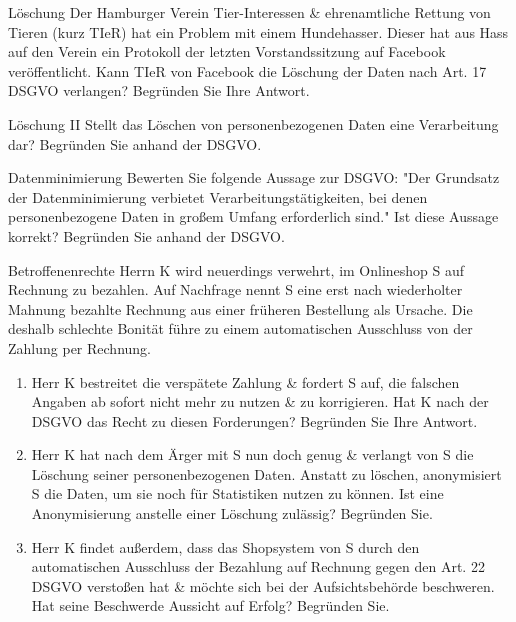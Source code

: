 \documentclass{exercisesheet}
\begin{document}
\begin{exercise*}{Löschung}
  Der Hamburger Verein Tier-Interessen \& ehrenamtliche Rettung von Tieren (kurz TIeR) hat ein Problem mit einem Hundehasser. Dieser hat aus Hass auf den Verein ein Protokoll der letzten Vorstandssitzung auf Facebook veröffentlicht. Kann TIeR von Facebook die Löschung der Daten nach Art. 17 DSGVO verlangen? Begründen Sie Ihre Antwort.
\end{exercise*}

\begin{exercise*}{Löschung II}
  Stellt das Löschen von personenbezogenen Daten eine Verarbeitung dar? Begründen Sie anhand der DSGVO.
\end{exercise*}

\begin{exercise*}{Datenminimierung}
  Bewerten Sie folgende Aussage zur DSGVO: "Der Grundsatz der Datenminimierung verbietet Verarbeitungstätigkeiten, bei denen personenbezogene Daten in großem Umfang erforderlich sind." Ist diese Aussage korrekt? Begründen Sie anhand der DSGVO.
\end{exercise*}

\begin{exercise*}{Betroffenenrechte}
  Herrn K wird neuerdings verwehrt, im Onlineshop S auf Rechnung zu bezahlen. Auf Nachfrage nennt S eine erst nach wiederholter Mahnung bezahlte Rechnung aus einer früheren Bestellung als Ursache. Die deshalb schlechte Bonität führe zu einem automatischen Ausschluss von der Zahlung per Rechnung.
  \begin{enumerate}
    \item Herr K bestreitet die verspätete Zahlung \& fordert S auf, die falschen Angaben ab sofort nicht mehr zu nutzen \& zu korrigieren. Hat K nach der DSGVO das Recht zu diesen Forderungen? Begründen Sie Ihre Antwort.
    \item Herr K hat nach dem Ärger mit S nun doch genug \& verlangt von S die Löschung seiner personenbezogenen Daten. Anstatt zu löschen, anonymisiert S die Daten, um sie noch für Statistiken nutzen zu können. Ist eine Anonymisierung anstelle einer Löschung zulässig? Begründen Sie.
    \item Herr K findet außerdem, dass das Shopsystem von S durch den automatischen Ausschluss der Bezahlung auf Rechnung gegen den Art. 22 DSGVO verstoßen hat \& möchte sich bei der Aufsichtsbehörde beschweren. Hat seine Beschwerde Aussicht auf Erfolg? Begründen Sie.
  \end{enumerate}
\end{exercise*}
\end{document}
